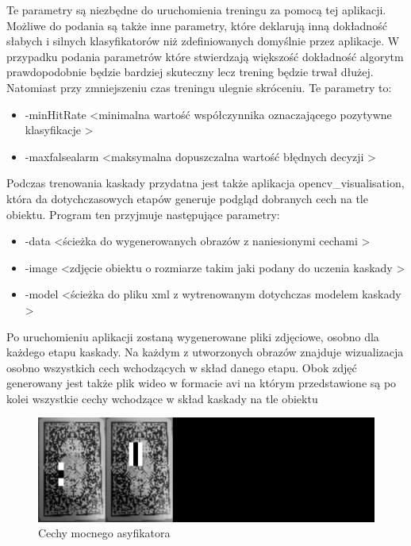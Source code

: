 Te parametry są niezbędne do uruchomienia treningu za pomocą tej aplikacji. Możliwe do podania są także inne parametry, które deklarują inną dokładność słabych i silnych klasyfikatorów niż zdefiniowanych domyślnie przez aplikacje. W przypadku podania parametrów które stwierdzają większość dokładność algorytm prawdopodobnie będzie bardziej skuteczny lecz trening będzie trwał dłużej. Natomiast przy zmniejszeniu czas treningu ulegnie skróceniu. Te parametry to:
 
\begin{itemize}
    \item -minHitRate \textless minimalna wartość współczynnika oznaczającego pozytywne klasyfikacje \textgreater
    \item -maxfalsealarm \textless maksymalna dopuszczalna wartość błędnych decyzji \textgreater

\end{itemize}

Podczas trenowania kaskady przydatna jest także aplikacja opencv\_visualisation, która da dotychczasowych etapów generuje podgląd dobranych cech na tle obiektu. Program ten przyjmuje następujące parametry:

\begin{itemize}
    \item -data \textless ścieżka do wygenerowanych obrazów z naniesionymi cechami \textgreater
    \item -image \textless zdjęcie obiektu o rozmiarze takim jaki podany do uczenia kaskady \textgreater
    \item -model  \textless ścieżka do pliku xml z wytrenowanym dotychczas modelem kaskady \textgreater

\end{itemize}

Po uruchomieniu aplikacji zostaną wygenerowane pliki zdjęciowe, osobno dla każdego etapu kaskady. Na każdym z utworzonych obrazów znajduje wizualizacja osobno wszystkich cech wchodzących w skład danego etapu. Obok zdjęć generowany jest także plik wideo w formacie avi na którym przedstawione są po kolei wszystkie cechy wchodzące w skład kaskady na tle obiektu

\begin{figure}[H]
\centering
\includegraphics[scale=0.1]{imgs/data3stage_1.png}
\caption{Cechy mocnego asyfikatora}
\end{figure}

